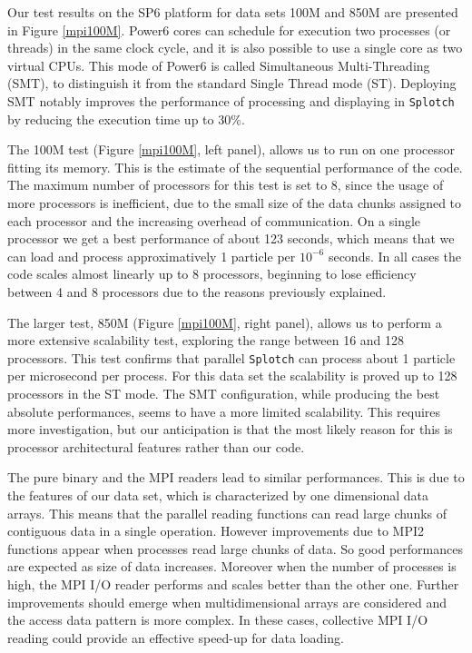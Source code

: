 \documentclass[1p,times]{elsarticle}
\begin{document}
Our test results on the SP6 platform for data sets 100M and 850M
are presented in Figure \ref{mpi100M}.
Power6 cores can schedule for execution two processes (or threads) in the same clock cycle, 
and it is also possible to use a single core as two virtual CPUs. This mode of Power6 
is called Simultaneous Multi-Threading (SMT), to distinguish it from 
the standard Single Thread mode (ST).
Deploying SMT notably improves the performance 
of processing and displaying in {\tt Splotch} by reducing the execution time up to  
$30\%$.

The 100M test (Figure \ref{mpi100M}, left panel), allows us 
to run on one processor fitting its memory. 
This is the estimate of the sequential performance of the code. 
The maximum number of processors for this test is set to 8, since the usage of 
more processors is inefficient, due to the small size 
of the data chunks assigned to each processor and the increasing overhead of communication.
On a single processor we get a best performance of about 123 seconds, which means that 
we can load and process approximatively 1 particle per $10^{-6}$ seconds. 
In all cases the code scales almost linearly up to 8 processors, beginning to lose
efficiency between 4 and 8 processors due to the reasons previously explained. 

The larger test, 850M (Figure \ref{mpi100M}, right panel), 
allows us to perform a more extensive scalability test, 
exploring the range between 16 and 128 processors. This test confirms that parallel
{\tt Splotch} can process about 1 particle per microsecond per process. For this data set the scalability
is proved up to 128 processors in the ST mode. The SMT configuration, 
while producing the best absolute performances, seems to have a more limited scalability. 
This requires more investigation, but our anticipation is that the most likely reason for this is processor 
architectural features rather than our code.

The pure binary and the MPI readers lead to similar performances. This is due to the features 
of our data set, which is characterized by one dimensional data arrays. This means
that the parallel reading functions can read large chunks of contiguous data 
in a single operation. However improvements due to MPI2 functions appear when 
processes read large chunks of data. So good performances are expected as size of data increases. 
Moreover when the number of processes is high, the MPI I/O reader performs and scales 
better than the other one. Further improvements should emerge when multidimensional 
arrays are considered and the access data pattern is more complex. 
In these cases, collective MPI I/O reading could provide an effective speed-up for data loading.
\end{document}
